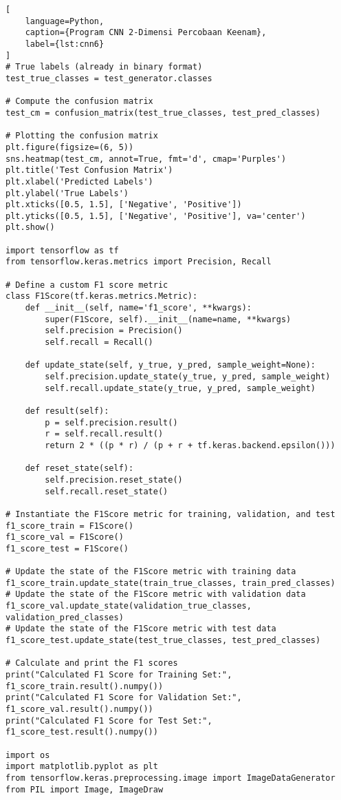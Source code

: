 \begin{lstlisting}[
    language=Python,
    caption={Program CNN 2-Dimensi Percobaan Keenam},
    label={lst:cnn6}
]
# True labels (already in binary format)
test_true_classes = test_generator.classes

# Compute the confusion matrix
test_cm = confusion_matrix(test_true_classes, test_pred_classes)

# Plotting the confusion matrix
plt.figure(figsize=(6, 5))
sns.heatmap(test_cm, annot=True, fmt='d', cmap='Purples')
plt.title('Test Confusion Matrix')
plt.xlabel('Predicted Labels')
plt.ylabel('True Labels')
plt.xticks([0.5, 1.5], ['Negative', 'Positive'])
plt.yticks([0.5, 1.5], ['Negative', 'Positive'], va='center')
plt.show()

import tensorflow as tf
from tensorflow.keras.metrics import Precision, Recall

# Define a custom F1 score metric
class F1Score(tf.keras.metrics.Metric):
    def __init__(self, name='f1_score', **kwargs):
        super(F1Score, self).__init__(name=name, **kwargs)
        self.precision = Precision()
        self.recall = Recall()

    def update_state(self, y_true, y_pred, sample_weight=None):
        self.precision.update_state(y_true, y_pred, sample_weight)
        self.recall.update_state(y_true, y_pred, sample_weight)

    def result(self):
        p = self.precision.result()
        r = self.recall.result()
        return 2 * ((p * r) / (p + r + tf.keras.backend.epsilon()))

    def reset_state(self):
        self.precision.reset_state()
        self.recall.reset_state()

# Instantiate the F1Score metric for training, validation, and test
f1_score_train = F1Score()
f1_score_val = F1Score()
f1_score_test = F1Score()

# Update the state of the F1Score metric with training data
f1_score_train.update_state(train_true_classes, train_pred_classes)
# Update the state of the F1Score metric with validation data
f1_score_val.update_state(validation_true_classes, validation_pred_classes)
# Update the state of the F1Score metric with test data
f1_score_test.update_state(test_true_classes, test_pred_classes)

# Calculate and print the F1 scores
print("Calculated F1 Score for Training Set:", f1_score_train.result().numpy())
print("Calculated F1 Score for Validation Set:", f1_score_val.result().numpy())
print("Calculated F1 Score for Test Set:", f1_score_test.result().numpy())

import os
import matplotlib.pyplot as plt
from tensorflow.keras.preprocessing.image import ImageDataGenerator
from PIL import Image, ImageDraw


\end{lstlisting}
